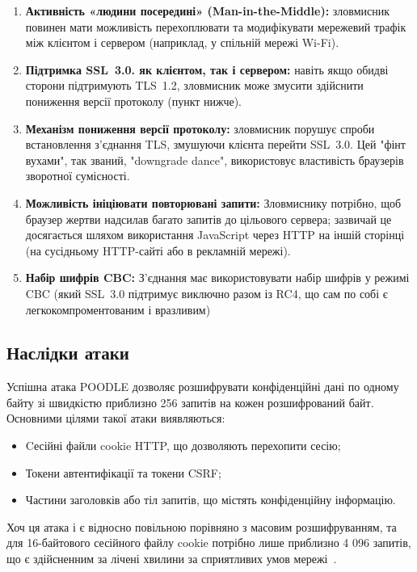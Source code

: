 \begin{enumerate}
    \item \textbf{Активність «людини посередині» (Man-in-the-Middle):} зловмисник повинен мати можливість перехоплювати 
        та модифікувати мережевий трафік між клієнтом і сервером (наприклад, у спільній мережі Wi-Fi).
    \item \textbf{Підтримка SSL~3.0. як клієнтом, так і сервером:} навіть якщо обидві сторони підтримують TLS~1.2, 
        зловмисник може змусити здійснити пониження версії протоколу (пункт нижче).
    \item \textbf{Механізм пониження версії протоколу:} зловмисник порушує спроби встановлення з'єднання TLS, змушуючи 
        клієнта перейти SSL~3.0. Цей "фінт вухами"{}, так званий, "downgrade dance"{}, використовує властивість 
        браузерів зворотної сумісності.
    \item \textbf{Можливість ініціювати повторювані запити:} Зловмиснику потрібно, щоб браузер жертви надсилав багато 
        запитів до цільового сервера; зазвичай це досягається шляхом використання JavaScript через HTTP на іншій 
        сторінці (на сусідньому HTTP-сайті або в рекламній мережі).
    \item \textbf{Набір шифрів CBC:} З'єднання має використовувати набір шифрів у режимі CBC (який SSL~3.0 підтримує 
        виключно разом із RC4, що сам по собі є легкокомпроментованим і вразливим)
\end{enumerate}

\subsection{Наслідки атаки}

Успішна атака POODLE дозволяє розшифрувати конфіденційні дані по одному байту зі швидкістю приблизно 256 запитів 
на кожен розшифрований байт. Основними цілями такої атаки виявляються:
\begin{itemize}
    \item Cесійні файли cookie HTTP, що дозволяють перехопити сесію;
    \item Токени автентифікації та токени CSRF;
    \item Частини заголовків або тіл запитів, що містять конфіденційну інформацію.
\end{itemize}

Хоч ця атака і є відносно повільною порівняно з масовим розшифруванням, та для 16-байтового сесійного файлу 
cookie потрібно лише приблизно 4 096 запитів, що є здійсненним за лічені хвилини за сприятливих умов мережі~\cite{poodle_paper}.

